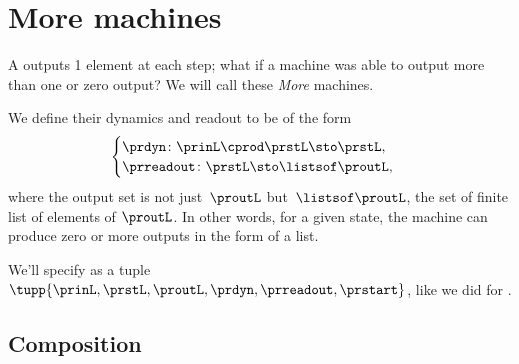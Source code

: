 
\section{More machines}
\label{sec:more-machines}

A  outputs 1 element at each step; what if a machine was able to output more than one or zero output?
We will call these \emph{More} machines.

We define their dynamics and readout to be of the form
%
\begin{equation}
    \label{eq:more-signature}
    \begin{cases}
        \prdyn \colon \prinL \cprod \prstL \sto \prstL, \\
        \prreadout \colon \prstL \sto \listsof \proutL,
    \end{cases}
\end{equation}
%
where the output set is not just~$\proutL$ but~$\listsof \proutL$, the set of finite list of elements of $\proutL$.
In other words, for a given state, the machine can produce zero or more outputs in the form of a list.

We'll specify  as a tuple~$\tupp{\prinL,\prstL,\proutL,\prdyn,\prreadout,\prstart}$, like we did for .

\subsection{Composition}

